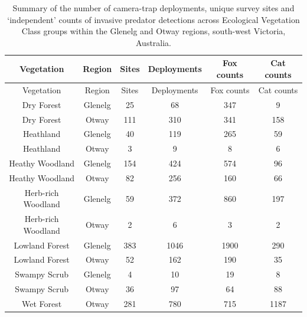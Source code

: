 \documentclass[]{elsarticle} %
\begin{document}
\newpage

\begin{longtable}[]{@{}cccccc@{}}
\caption{Summary of the number of camera-trap deployments, unique survey sites and `independent' counts of invasive predator detections across Ecological Vegetation Class groups within the Glenelg and Otway regions, south-west Victoria, Australia.}\tabularnewline
\toprule
Vegetation & Region & Sites & Deployments & Fox counts & Cat counts\tabularnewline
\midrule
\endfirsthead
\toprule
Vegetation & Region & Sites & Deployments & Fox counts & Cat counts\tabularnewline
\midrule
\endhead
Dry Forest & Glenelg & 25 & 68 & 347 & 9\tabularnewline
Dry Forest & Otway & 111 & 310 & 341 & 158\tabularnewline
Heathland & Glenelg & 40 & 119 & 265 & 59\tabularnewline
Heathland & Otway & 3 & 9 & 8 & 6\tabularnewline
Heathy Woodland & Glenelg & 154 & 424 & 574 & 96\tabularnewline
Heathy Woodland & Otway & 82 & 256 & 160 & 66\tabularnewline
Herb-rich Woodland & Glenelg & 59 & 372 & 860 & 197\tabularnewline
Herb-rich Woodland & Otway & 2 & 6 & 3 & 2\tabularnewline
Lowland Forest & Glenelg & 383 & 1046 & 1900 & 290\tabularnewline
Lowland Forest & Otway & 52 & 162 & 190 & 35\tabularnewline
Swampy Scrub & Glenelg & 4 & 10 & 19 & 8\tabularnewline
Swampy Scrub & Otway & 36 & 97 & 64 & 88\tabularnewline
Wet Forest & Otway & 281 & 780 & 715 & 1187\tabularnewline
\bottomrule
\end{longtable}

\newpage
\end{document}
